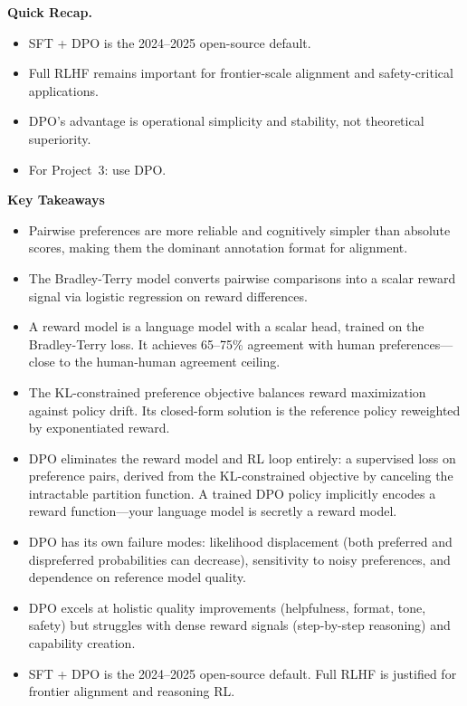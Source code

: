 \begin{quickrecap}
\textbf{Quick Recap.}
\begin{itemize}[nosep,leftmargin=1.5em]
  \item SFT + DPO is the 2024--2025 open-source default.
  \item Full RLHF remains important for frontier-scale alignment and safety-critical applications.
  \item DPO's advantage is operational simplicity and stability, not theoretical superiority.
  \item For Project~3: use DPO.
\end{itemize}
\end{quickrecap}


\begin{takeaways}
\textbf{Key Takeaways}
\begin{itemize}[nosep]
  \item Pairwise preferences are more reliable and cognitively simpler than absolute scores, making them the dominant annotation format for alignment.
  \item The Bradley-Terry model converts pairwise comparisons into a scalar reward signal via logistic regression on reward differences.
  \item A reward model is a language model with a scalar head, trained on the Bradley-Terry loss. It achieves 65--75\% agreement with human preferences---close to the human-human agreement ceiling.
  \item The KL-constrained preference objective balances reward maximization against policy drift. Its closed-form solution is the reference policy reweighted by exponentiated reward.
  \item DPO eliminates the reward model and RL loop entirely: a supervised loss on preference pairs, derived from the KL-constrained objective by canceling the intractable partition function. A trained DPO policy implicitly encodes a reward function---your language model is secretly a reward model.
  \item DPO has its own failure modes: likelihood displacement (both preferred and dispreferred probabilities can decrease), sensitivity to noisy preferences, and dependence on reference model quality.
  \item DPO excels at holistic quality improvements (helpfulness, format, tone, safety) but struggles with dense reward signals (step-by-step reasoning) and capability creation.
  \item SFT + DPO is the 2024--2025 open-source default. Full RLHF is justified for frontier alignment and reasoning RL.
\end{itemize}
\end{takeaways}


